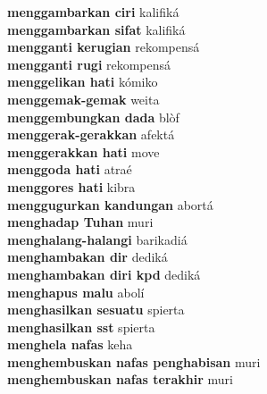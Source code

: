 \textbf{ menggambarkan ciri  } kalifiká \\
\textbf{ menggambarkan sifat  } kalifiká \\
\textbf{ mengganti kerugian  } rekompensá \\
\textbf{ mengganti rugi  } rekompensá \\
\textbf{ menggelikan hati  } kómiko \\
\textbf{ menggemak-gemak  } weita \\
\textbf{ menggembungkan dada  } blòf \\
\textbf{ menggerak-gerakkan  } afektá \\
\textbf{ menggerakkan hati  } move \\
\textbf{ menggoda hati  } atraé \\
\textbf{ menggores hati  } kibra \\
\textbf{ menggugurkan kandungan  } abortá \\
\textbf{ menghadap Tuhan  } muri \\
\textbf{ menghalang-halangi  } barikadiá \\
\textbf{ menghambakan dir  } dediká \\
\textbf{ menghambakan diri kpd  } dediká \\
\textbf{ menghapus malu  } abolí \\
\textbf{ menghasilkan sesuatu  } spierta \\
\textbf{ menghasilkan sst  } spierta \\
\textbf{ menghela nafas  } keha \\
\textbf{ menghembuskan nafas penghabisan  } muri \\
\textbf{ menghembuskan nafas terakhir  } muri \\

